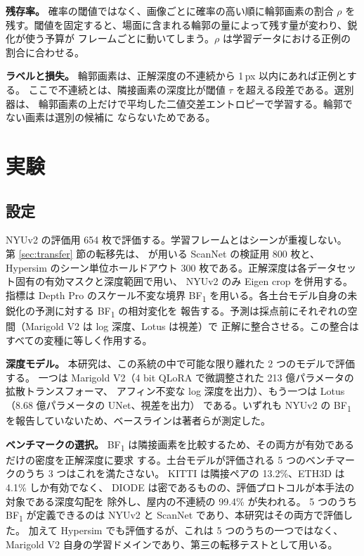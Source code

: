\documentclass[conference]{IEEEtran}
\newcommand{\bfone}{BF\textsubscript{1}}
\begin{document}
\textbf{残存率。} 確率の閾値ではなく、画像ごとに確率の高い順に輪郭画素の割合 $\rho$ を
残す。閾値を固定すると、場面に含まれる輪郭の量によって残す量が変わり、鋭化が使う予算が
フレームごとに動いてしまう。$\rho$ は学習データにおける正例の割合に合わせる。

\textbf{ラベルと損失。} 輪郭画素は、正解深度の不連続から 1\,px 以内にあれば正例とする。
ここで不連続とは、隣接画素の深度比が閾値 $\tau$ を超える段差である。選別器は、
輪郭画素の上だけで平均した二値交差エントロピーで学習する。輪郭でない画素は選別の候補に
ならないためである。

\section{実験}
\label{sec:experiments}

\subsection{設定}
NYUv2 \cite{nyuv2} の評価用 654 枚で評価する。学習フレームとはシーンが重複しない。
第 \ref{sec:transfer} 節の転移先は、\cite{marigoldv2} が用いる ScanNet
\cite{scannet} の検証用 800 枚と、Hypersim \cite{hypersim} のシーン単位ホールドアウト
300 枚である。正解深度は各データセット固有の有効マスクと深度範囲で用い、
NYUv2 のみ Eigen crop を併用する。
指標は Depth Pro \cite{depthpro} のスケール不変な境界 \bfone{} を用いる。各土台モデル自身の未鋭化の予測に対する \bfone{} の相対変化を
報告する。予測は採点前にそれぞれの空間（Marigold V2 は log 深度、Lotus は視差）で
正解に整合させる。この整合はすべての変種に等しく作用する。

\textbf{深度モデル。} 本研究は、この系統の中で可能な限り離れた 2 つのモデルで評価する。
一つは Marigold V2（4 bit QLoRA で微調整された 213 億パラメータの拡散トランスフォーマ、
アフィン不変な log 深度を出力）、もう一つは Lotus（8.68 億パラメータの UNet、視差を出力）
である。いずれも NYUv2 の \bfone{} を報告していないため、ベースラインは著者らが測定した。

\textbf{ベンチマークの選択。}
\bfone{} は隣接画素を比較するため、その両方が有効であるだけの密度を正解深度に要求
する。土台モデルが評価される 5 つのベンチマークのうち 3 つはこれを満たさない。
KITTI \cite{kitti} は隣接ペアの 13.2\%、ETH3D \cite{eth3d} は 4.1\% しか有効でなく、
DIODE \cite{diode} は密であるものの、評価プロトコルが本手法の対象である深度勾配を
除外し、屋内の不連続の 99.4\% が失われる。
5 つのうち \bfone{} が定義できるのは NYUv2 と ScanNet であり、本研究はその両方で評価した。
加えて Hypersim でも評価するが、これは 5 つのうちの一つではなく、
Marigold V2 自身の学習ドメインであり、第三の転移テストとして用いる。
\end{document}

